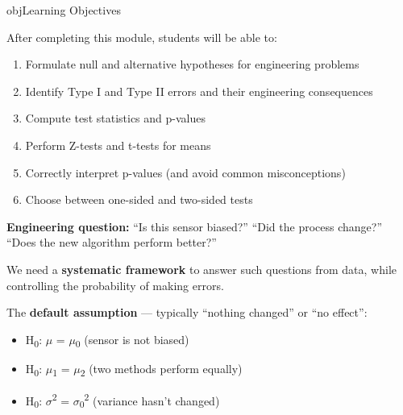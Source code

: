 \begin{PSbox}[unbreakable]{obj}{Learning Objectives}

After completing this module, students will be able to:

\begin{enumerate}
\def\labelenumi{\arabic{enumi}.}
\tightlist
\item
  Formulate null and alternative hypotheses for engineering problems
\item
  Identify Type I and Type II errors and their engineering consequences
\item
  Compute test statistics and p-values
\item
  Perform Z-tests and t-tests for means
\item
  Correctly interpret p-values (and avoid common misconceptions)
\item
  Choose between one-sided and two-sided tests
\end{enumerate}

\end{PSbox}


\textbf{Engineering question:} ``Is this sensor biased?'' ``Did the process change?'' ``Does the new algorithm perform better?''

We need a \textbf{systematic framework} to answer such questions from data, while controlling the probability of making errors.



The \textbf{default assumption} — typically ``nothing changed'' or ``no effect'':

\begin{itemize}
\tightlist
\item
  H\textsubscript{0}: \ensuremath{\mu} = \ensuremath{\mu}\textsubscript{0} (sensor is not biased)
\item
  H\textsubscript{0}: \ensuremath{\mu}\textsubscript{1} = \ensuremath{\mu}\textsubscript{2} (two methods perform equally)
\item
  H\textsubscript{0}: \ensuremath{\sigma}\textsuperscript{2} = \ensuremath{\sigma}\textsubscript{0}\textsuperscript{2} (variance hasn’t changed)
\end{itemize}


